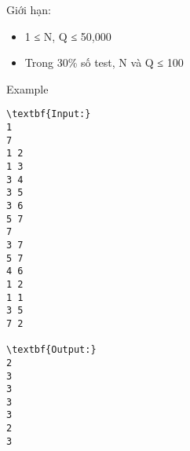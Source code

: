 Giới hạn:  
\begin{itemize}
	\item     1 ≤ N, Q ≤ 50,000   
	\item     Trong 30\% số test, N và Q ≤ 100   
\end{itemize}
   Example  
\begin{verbatim}
\textbf{Input:}
1
7
1 2
1 3
3 4
3 5
3 6
5 7
7
3 7
5 7
4 6
1 2
1 1
3 5
7 2

\textbf{Output:}
2
3
3
3
3
2
3
\end{verbatim}